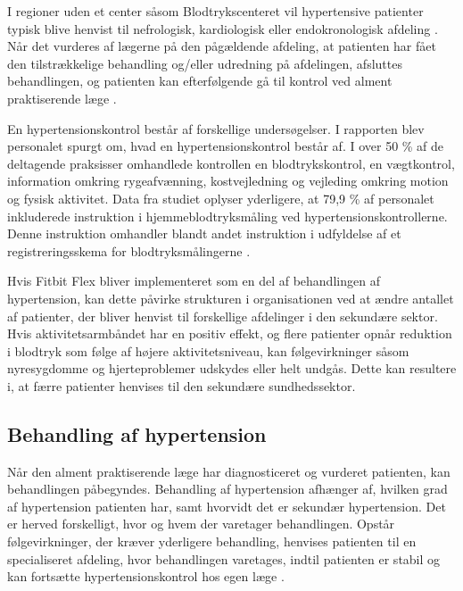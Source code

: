 I regioner uden et center såsom Blodtrykscenteret vil hypertensive patienter typisk blive henvist til nefrologisk, kardiologisk eller endokronologisk afdeling \citep{buur2011}. Når det vurderes af lægerne på den pågældende afdeling, at patienten har fået den tilstrækkelige behandling og/eller udredning på afdelingen, afsluttes behandlingen, og patienten kan efterfølgende gå til kontrol ved alment praktiserende læge \citep{sundhedsstyrelsen2010, lodberg2016}.

En hypertensionskontrol består af forskellige  undersøgelser. I rapporten  blev personalet spurgt om, hvad en  hypertensionskontrol består af. I over 50 \% af de deltagende praksisser omhandlede kontrollen en blodtrykskontrol, en vægtkontrol, information omkring rygeafvænning, kostvejledning og vejleding omkring motion og fysisk aktivitet. Data fra studiet oplyser yderligere, at 79,9 \% af personalet inkluderede instruktion i hjemmeblodtryksmåling ved hypertensionskontrollerne. Denne instruktion omhandler blandt andet instruktion i udfyldelse af et registreringsskema for blodtryksmålingerne \citep{munck2007}. 

Hvis Fitbit Flex bliver implementeret som en del af behandlingen af hypertension, kan dette påvirke strukturen i organisationen ved at ændre antallet af patienter, der bliver henvist til forskellige afdelinger i den sekundære sektor. Hvis aktivitetsarmbåndet har en positiv effekt, og flere patienter opnår reduktion i blodtryk som følge af højere aktivitetsniveau, kan følgevirkninger såsom nyresygdomme og hjerteproblemer udskydes eller helt undgås. Dette kan resultere i, at færre patienter henvises til den sekundære sundhedssektor. 

\subsection{Behandling af hypertension} \label{sec:beh_hypertension}

Når den alment praktiserende læge har diagnosticeret og vurderet patienten, kan behandlingen påbegyndes. Behandling af hypertension afhænger af, hvilken grad af hypertension patienten har, samt hvorvidt det er sekundær hypertension. Det er herved forskelligt, hvor og hvem der varetager behandlingen. Opstår følgevirkninger, der kræver yderligere behandling, henvises patienten til en specialiseret afdeling, hvor behandlingen varetages, indtil patienten er stabil og kan fortsætte hypertensionskontrol hos egen læge \citep{sundhedsstyrelsen2010}.

